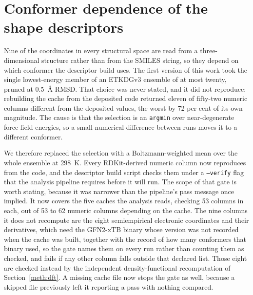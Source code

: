 \documentclass[journal=jacsat,manuscript=suppinfo,margin=1in]{achemso}
\begin{document}
\section{Conformer dependence of the shape descriptors}
\label{meth:conformer}

Nine of the coordinates in every structural space are read from a
three-dimensional structure rather than from the SMILES string, so they depend
on which conformer the descriptor build uses. The first version of this work
took the single lowest-energy member of an ETKDGv3 ensemble of at most twenty,
pruned at 0.5~\AA{} RMSD. That choice was never stated, and it did not
reproduce: rebuilding the cache from the deposited code returned eleven of
fifty-two numeric columns different from the deposited values, the worst by 72
per cent of its own magnitude. The cause is that the selection is an
\texttt{argmin} over near-degenerate force-field energies, so a small numerical
difference between runs moves it to a different conformer.

We therefore replaced the selection with a Boltzmann-weighted mean over the
whole ensemble at 298~K. Every RDKit-derived numeric column now reproduces
from the code, and the descriptor
build script checks them under a \texttt{--verify} flag that the analysis
pipeline requires before it will run. The scope of that gate is worth stating,
because it was narrower than the pipeline's pass message once implied. It now
covers the five caches the analysis reads, checking 53 columns in each, out of
53 to 62 numeric columns depending on the cache. The nine
columns it does not recompute are the eight semiempirical electronic
coordinates and their derivatives, which need the GFN2-xTB binary whose version
was not recorded when the cache was built, together with the record of how many
conformers that binary used, so the gate names them on every run rather
than counting them as checked, and fails if any other column falls outside that
declared list. Those eight are checked instead by the independent
density-functional recomputation of Section~\ref{meth:dft}. A missing cache
file now stops the gate as well, because a skipped file previously left it
reporting a pass with nothing compared.
\end{document}
